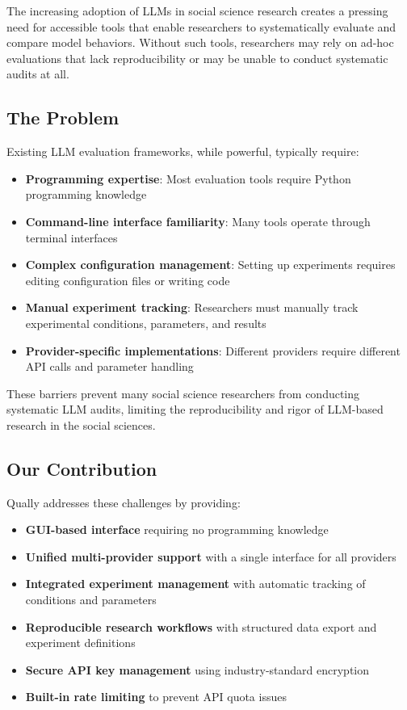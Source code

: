 \documentclass[11pt,a4paper]{article}
\begin{document}
The increasing adoption of LLMs in social science research creates a pressing need for accessible tools that enable researchers to systematically evaluate and compare model behaviors. Without such tools, researchers may rely on ad-hoc evaluations that lack reproducibility or may be unable to conduct systematic audits at all.

\subsection{The Problem}

Existing LLM evaluation frameworks, while powerful, typically require:
\begin{itemize}
    \item \textbf{Programming expertise}: Most evaluation tools require Python programming knowledge
    \item \textbf{Command-line interface familiarity}: Many tools operate through terminal interfaces
    \item \textbf{Complex configuration management}: Setting up experiments requires editing configuration files or writing code
    \item \textbf{Manual experiment tracking}: Researchers must manually track experimental conditions, parameters, and results
    \item \textbf{Provider-specific implementations}: Different providers require different API calls and parameter handling
\end{itemize}

These barriers prevent many social science researchers from conducting systematic LLM audits, limiting the reproducibility and rigor of LLM-based research in the social sciences.

\subsection{Our Contribution}

Qually addresses these challenges by providing:
\begin{itemize}
    \item \textbf{GUI-based interface} requiring no programming knowledge
    \item \textbf{Unified multi-provider support} with a single interface for all providers
    \item \textbf{Integrated experiment management} with automatic tracking of conditions and parameters
    \item \textbf{Reproducible research workflows} with structured data export and experiment definitions
    \item \textbf{Secure API key management} using industry-standard encryption
    \item \textbf{Built-in rate limiting} to prevent API quota issues
\end{itemize}
\end{document}
